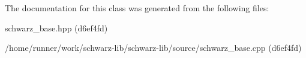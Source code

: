 The documentation for this class was generated from the following files\+:\begin{DoxyCompactItemize}
\item 
schwarz\+\_\+base.\+hpp (d6ef4fd)\item 
/home/runner/work/schwarz-\/lib/schwarz-\/lib/source/schwarz\+\_\+base.\+cpp (d6ef4fd)\end{DoxyCompactItemize}
